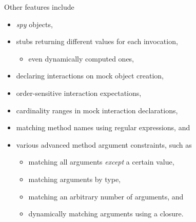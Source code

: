 Other features include
\autocite[Chapter: Interaction Based Testing]{SpockFrameworkDoc}
\begin{itemize}
  \item \textit{spy} objects,
  \item stubs returning different values for each invocation,
    \begin{itemize}
      \item even dynamically computed ones,
    \end{itemize}
  \item declaring interactions on mock object creation,
  \item order-sensitive interaction expectations,
  \item cardinality ranges in mock interaction declarations,
  \item matching method names using regular expressions, and
  \item various advanced method argument constraints, such as
    \begin{itemize}
      \item matching all arguments \textit{except} a certain value,
      \item matching arguments by type,
      \item matching an arbitrary number of arguments, and
      \item dynamically matching arguments using a closure.
    \end{itemize}
\end{itemize}
